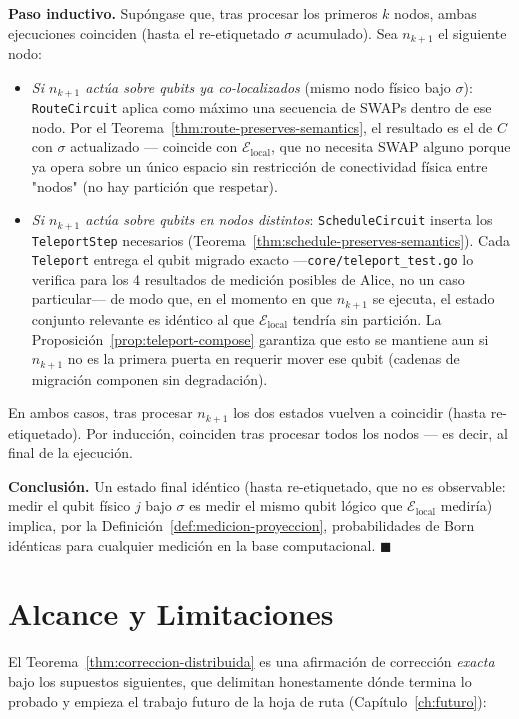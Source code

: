 \documentclass[12pt, a4paper, openany]{report}
\theoremstyle{definition}
\begin{document}
\textbf{Paso inductivo.} Supóngase que, tras procesar los primeros $k$ nodos, ambas ejecuciones coinciden (hasta el re-etiquetado $\sigma$ acumulado). Sea $n_{k+1}$ el siguiente nodo:

\begin{itemize}
  \item \emph{Si $n_{k+1}$ actúa sobre qubits ya co-localizados} (mismo nodo físico bajo $\sigma$): \texttt{RouteCircuit} aplica como máximo una secuencia de \textsc{SWAP}s dentro de ese nodo. Por el Teorema~\ref{thm:route-preserves-semantics}, el resultado es el de $C$ con $\sigma$ actualizado — coincide con $\mathcal{E}_{\text{local}}$, que no necesita \textsc{SWAP} alguno porque ya opera sobre un único espacio sin restricción de conectividad física entre "nodos" (no hay partición que respetar).
  \item \emph{Si $n_{k+1}$ actúa sobre qubits en nodos distintos}: \texttt{ScheduleCircuit} inserta los \texttt{TeleportStep} necesarios (Teorema~\ref{thm:schedule-preserves-semantics}). Cada \texttt{Teleport} entrega el qubit migrado exacto —\texttt{core/teleport\_test.go} lo verifica para los 4 resultados de medición posibles de Alice, no un caso particular— de modo que, en el momento en que $n_{k+1}$ se ejecuta, el estado conjunto relevante es idéntico al que $\mathcal{E}_{\text{local}}$ tendría sin partición. La Proposición~\ref{prop:teleport-compose} garantiza que esto se mantiene aun si $n_{k+1}$ no es la primera puerta en requerir mover ese qubit (cadenas de migración componen sin degradación).
\end{itemize}

En ambos casos, tras procesar $n_{k+1}$ los dos estados vuelven a coincidir (hasta re-etiquetado). Por inducción, coinciden tras procesar todos los nodos — es decir, al final de la ejecución.

\textbf{Conclusión.} Un estado final idéntico (hasta re-etiquetado, que no es observable: medir el qubit físico $j$ bajo $\sigma$ es medir el mismo qubit lógico que $\mathcal{E}_{\text{local}}$ mediría) implica, por la Definición~\ref{def:medicion-proyeccion}, probabilidades de Born idénticas para cualquier medición en la base computacional. $\blacksquare$

\section{Alcance y Limitaciones}

El Teorema~\ref{thm:correccion-distribuida} es una afirmación de corrección \emph{exacta} bajo los supuestos siguientes, que delimitan honestamente dónde termina lo probado y empieza el trabajo futuro de la hoja de ruta (Capítulo~\ref{ch:futuro}):
\end{document}
